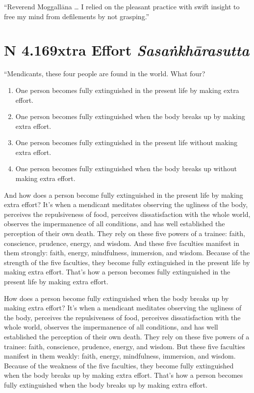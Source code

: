 \documentclass[12pt,openany]{book}%
\newcommand*{\suttatitleacronym}[1]{\smaller[2]{#1}\vspace*{.3em}}
\newcommand*{\suttatitletranslation}[1]{\linebreak{#1}}
\newcommand*{\suttatitleroot}[1]{\linebreak\smaller[2]\itshape{#1}}
\newcommand*{\tocacronym}[1]{\hspace*{-3.3em}{#1}\quad}
\newcommand*{\toctranslation}[1]{#1}
\newcommand*{\tocroot}[1]{(\textit{#1})}
\begin{document}
“Reverend \textsanskrit{Moggallāna} … I relied on the pleasant practice with swift insight to free my mind from defilements by not grasping.” 

%
\section*{{\suttatitleacronym AN 4.169}{\suttatitletranslation Extra Effort }{\suttatitleroot Sasaṅkhārasutta}}
\addcontentsline{toc}{section}{\tocacronym{AN 4.169} \toctranslation{Extra Effort } \tocroot{Sasaṅkhārasutta}}

“Mendicants, these four people are found in the world. What four? 

\begin{enumerate}%
\item One person becomes fully extinguished in the present life by making extra effort. %
\item One person becomes fully extinguished when the body breaks up by making extra effort. %
\item One person becomes fully extinguished in the present life without making extra effort. %
\item One person becomes fully extinguished when the body breaks up without making extra effort. %
\end{enumerate}

And how does a person become fully extinguished in the present life by making extra effort? It’s when a mendicant meditates observing the ugliness of the body, perceives the repulsiveness of food, perceives dissatisfaction with the whole world, observes the impermanence of all conditions, and has well established the perception of their own death. They rely on these five powers of a trainee: faith, conscience, prudence, energy, and wisdom. And these five faculties manifest in them strongly: faith, energy, mindfulness, immersion, and wisdom. Because of the strength of the five faculties, they become fully extinguished in the present life by making extra effort. That’s how a person becomes fully extinguished in the present life by making extra effort. 

How does a person become fully extinguished when the body breaks up by making extra effort? It’s when a mendicant meditates observing the ugliness of the body, perceives the repulsiveness of food, perceives dissatisfaction with the whole world, observes the impermanence of all conditions, and has well established the perception of their own death. They rely on these five powers of a trainee: faith, conscience, prudence, energy, and wisdom. But these five faculties manifest in them weakly: faith, energy, mindfulness, immersion, and wisdom. Because of the weakness of the five faculties, they become fully extinguished when the body breaks up by making extra effort. That’s how a person becomes fully extinguished when the body breaks up by making extra effort. 
\end{document}
